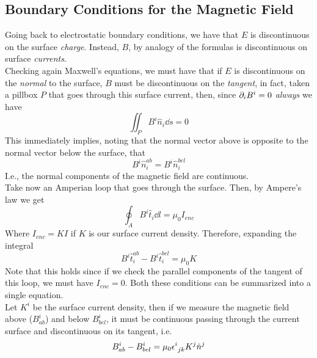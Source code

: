 \documentclass[../electromagnetism]{subfiles}
\begin{document}
\subsection{Boundary Conditions for the Magnetic Field}
Going back to electrostatic boundary conditions, we have that $E$ is discontinuous on the surface \textit{charge}. Instead, $B$, by analogy of the formulas is discontinuous on surface \textit{currents}.\\
Checking again Maxwell's equations, we must have that if $E$ is discontinuous on the \emph{normal} to the surface, $B$ must be discontinuous on the \emph{tangent}, in fact, taken a pillbox $P$ that goes through this surface current, then, since $\partial_iB^i=0$ \emph{always} we have
\begin{equation}
	\iint_PB^i\hat{n}_i\dd s=0
	\label{eq:pillboxsurfc}
\end{equation}
This immediately implies, noting that the normal vector above is opposite to the normal vector below the surface, that
\begin{equation}
	B^i\hat{n}^{ab}_i=B^i\hat{n}^{bel}_i
	\label{eq:normalcontinuity}
\end{equation}
I.e., the normal components of the magnetic field are continuous.\\
Take now an Amperian loop that goes through the surface. Then, by Ampere's law we get
\begin{equation*}
	\oint_AB^i\hat{t}_i\dd l=\mu_0I_{enc}
\end{equation*}
Where $I_{enc}=KI$ if $K$ is our surface current density. Therefore, expanding the integral
\begin{equation}
	B^i\hat{t}^{ab}_i-B^i\hat{t}^{bel}_i=\mu_0K
	\label{eq:abovebelowtangent}
\end{equation}
Note that this holds since if we check the parallel components of the tangent of this loop, we must have $I_{enc}=0$. Both these conditions can be summarized into a single equation.\\
Let $K^i$ be the surface current density, then if we measure the magnetic field above ($B^i_{ab}$) and below $B^i_{bel}$, it must be continuous passing through the current surface and discontinuous on its tangent, i.e.
\begin{equation}
	B^i_{ab}-B^i_{bel}=\mu_0\epsilon^{i}_{\ jk}K^j\hat{n}^j
	\label{eq:boundarycond}
\end{equation}
\end{document}
